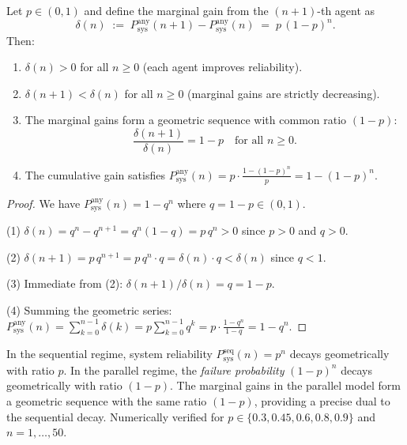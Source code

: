 \begin{theorem}
\label{thm:diminishing-returns}
Let $p \in (0,1)$ and define the marginal gain from the $(n+1)$-th agent as
\[
  \delta(n) \;:=\; P_{\mathrm{sys}}^{\mathrm{any}}(n+1) - P_{\mathrm{sys}}^{\mathrm{any}}(n)
  \;=\; p\,(1-p)^n.
\]
Then:
\begin{enumerate}
  \item $\delta(n) > 0$ for all $n \ge 0$ (each agent improves reliability).
  \item $\delta(n+1) < \delta(n)$ for all $n \ge 0$ (marginal gains are strictly decreasing).
  \item The marginal gains form a geometric sequence with common ratio $(1-p)$:
    \[
      \frac{\delta(n+1)}{\delta(n)} = 1 - p \quad \text{for all } n \ge 0.
    \]
  \item The cumulative gain satisfies $P_{\mathrm{sys}}^{\mathrm{any}}(n) = p \cdot \frac{1 - (1-p)^n}{p} = 1 - (1-p)^n$.
\end{enumerate}
\end{theorem}

\begin{proof}
We have $P_{\mathrm{sys}}^{\mathrm{any}}(n) = 1 - q^n$ where $q = 1-p \in (0,1)$.

(1) $\delta(n) = q^n - q^{n+1} = q^n(1-q) = p\,q^n > 0$ since $p > 0$ and $q > 0$.

(2) $\delta(n+1) = p\,q^{n+1} = p\,q^n \cdot q = \delta(n) \cdot q < \delta(n)$ since $q < 1$.

(3) Immediate from (2): $\delta(n+1)/\delta(n) = q = 1-p$.

(4) Summing the geometric series: $P_{\mathrm{sys}}^{\mathrm{any}}(n) = \sum_{k=0}^{n-1} \delta(k) = p \sum_{k=0}^{n-1} q^k = p \cdot \frac{1-q^n}{1-q} = 1 - q^n$.
\end{proof}

\begin{remark}
In the sequential regime, system reliability $P_{\mathrm{sys}}^{\mathrm{seq}}(n) = p^n$ decays
geometrically with ratio $p$. In the parallel regime, the \emph{failure probability}
$(1-p)^n$ decays geometrically with ratio $(1-p)$. The marginal gains in the parallel
model form a geometric sequence with the same ratio $(1-p)$, providing a precise dual
to the sequential decay. Numerically verified for $p \in \{0.3, 0.45, 0.6, 0.8, 0.9\}$
and $n = 1, \ldots, 50$.
\end{remark}

